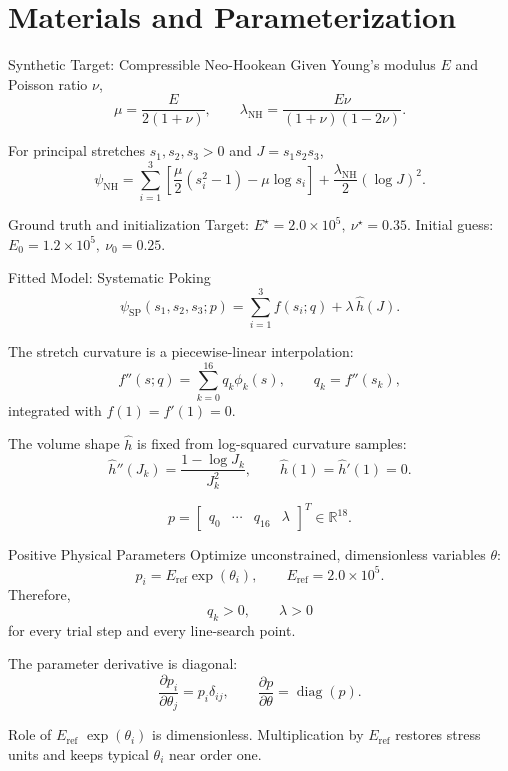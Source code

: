 \documentclass[aspectratio=169,10pt]{beamer}
\newcommand{\eref}{E_{\mathrm{ref}}}
\begin{document}
\section{Materials and Parameterization}

\begin{frame}{Synthetic Target: Compressible Neo-Hookean}
  \small
  Given Young's modulus $E$ and Poisson ratio $\nu$,
  \[
    \mu=\frac{E}{2(1+\nu)},
    \qquad
    \lambda_{\mathrm{NH}}
    =\frac{E\nu}{(1+\nu)(1-2\nu)}.
  \]

  For principal stretches $s_1,s_2,s_3>0$ and $J=s_1s_2s_3$,
  \[
    \psi_{\mathrm{NH}}
    =
    \sum_{i=1}^{3}
    \left[
      \frac{\mu}{2}(s_i^2-1)-\mu\log s_i
    \right]
    +
    \frac{\lambda_{\mathrm{NH}}}{2}(\log J)^2.
  \]

  \begin{block}{Ground truth and initialization}
    Target: $E^\star=2.0\times10^5,\ \nu^\star=0.35$.
    Initial guess: $E_0=1.2\times10^5,\ \nu_0=0.25$.
  \end{block}
\end{frame}

\begin{frame}{Fitted Model: Systematic Poking}
  \small
  \[
    \psi_{\mathrm{SP}}(s_1,s_2,s_3;p)
    =
    \sum_{i=1}^{3}f(s_i;q)
    +\lambda\,\widehat h(J).
  \]

  The stretch curvature is a piecewise-linear interpolation:
  \[
    f''(s;q)=\sum_{k=0}^{16}q_k\phi_k(s),
    \qquad
    q_k=f''(s_k),
  \]
  integrated with $f(1)=f'(1)=0$.

  The volume shape $\widehat h$ is fixed from log-squared curvature samples:
  \[
    \widehat h''(J_k)=\frac{1-\log J_k}{J_k^2},
    \qquad
    \widehat h(1)=\widehat h'(1)=0.
  \]

  \[
    p=
    \begin{bmatrix}q_0&\cdots&q_{16}&\lambda\end{bmatrix}^{T}
    \in\mathbb R^{18}.
  \]
\end{frame}

\begin{frame}{Positive Physical Parameters}
  \small
  Optimize unconstrained, dimensionless variables $\theta$:
  \[
    p_i=\eref\exp(\theta_i),
    \qquad
    \eref=2.0\times10^5.
  \]
  Therefore,
  \[
    q_k>0,\qquad \lambda>0
  \]
  for every trial step and every line-search point.

  The parameter derivative is diagonal:
  \[
    \frac{\partial p_i}{\partial\theta_j}
    =p_i\delta_{ij},
    \qquad
    \frac{\partial p}{\partial\theta}
    =\operatorname{diag}(p).
  \]

  \begin{block}{Role of $\eref$}
    $\exp(\theta_i)$ is dimensionless. Multiplication by $\eref$ restores
    stress units and keeps typical $\theta_i$ near order one.
  \end{block}
\end{frame}
\end{document}
